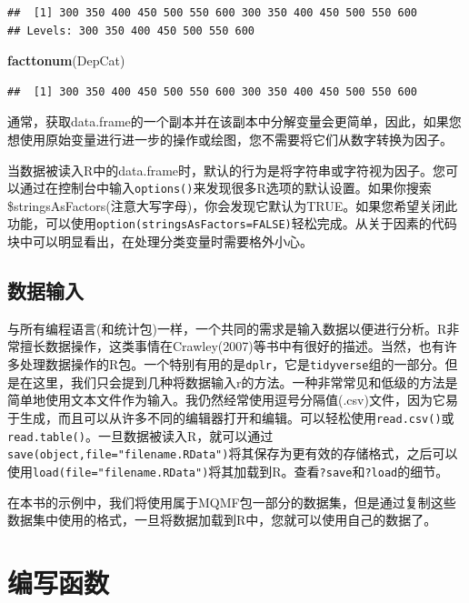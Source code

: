 \documentclass[
  lang=cn,
  11pt,
  scheme=chinese,
  chinesefont=nofont,
  citestyle=gb7714-2015,
  bibstyle=gb7714-2015]{elegantbook}
\newenvironment{Shaded}{\begin{snugshade}}{\end{snugshade}}
\newcommand{\FunctionTok}[1]{\textcolor[rgb]{0.13,0.29,0.53}{\textbf{#1}}}
\newcommand{\NormalTok}[1]{#1}
\begin{document}
\begin{verbatim}
##  [1] 300 350 400 450 500 550 600 300 350 400 450 500 550 600
## Levels: 300 350 400 450 500 550 600
\end{verbatim}

\begin{Shaded}
\begin{Highlighting}[]
\FunctionTok{facttonum}\NormalTok{(DepCat)  }
\end{Highlighting}
\end{Shaded}

\begin{verbatim}
##  [1] 300 350 400 450 500 550 600 300 350 400 450 500 550 600
\end{verbatim}

通常，获取data.frame的一个副本并在该副本中分解变量会更简单，因此，如果您想使用原始变量进行进一步的操作或绘图，您不需要将它们从数字转换为因子。

当数据被读入R中的data.frame时，默认的行为是将字符串或字符视为因子。您可以通过在控制台中输入\texttt{options()}来发现很多R选项的默认设置。如果你搜索\$stringsAsFactors(注意大写字母)，你会发现它默认为TRUE。如果您希望关闭此功能，可以使用\texttt{option(stringsAsFactors=FALSE)}轻松完成。从关于因素的代码块中可以明显看出，在处理分类变量时需要格外小心。

\subsection{数据输入}\label{ux6570ux636eux8f93ux5165}

与所有编程语言(和统计包)一样，一个共同的需求是输入数据以便进行分析。R非常擅长数据操作，这类事情在Crawley(2007)等书中有很好的描述。当然，也有许多处理数据操作的R包。一个特别有用的是\texttt{dplr}，它是\texttt{tidyverse}组的一部分。但是在这里，我们只会提到几种将数据输入r的方法。一种非常常见和低级的方法是简单地使用文本文件作为输入。我仍然经常使用逗号分隔值(.csv)文件，因为它易于生成，而且可以从许多不同的编辑器打开和编辑。可以轻松使用\texttt{read.csv()}或\texttt{read.table()}。一旦数据被读入R，就可以通过\texttt{save(object,file="filename.RData")}将其保存为更有效的存储格式，之后可以使用\texttt{load(file="filename.RData")}将其加载到R。查看\texttt{?save}和\texttt{?load}的细节。

在本书的示例中，我们将使用属于MQMF包一部分的数据集，但是通过复制这些数据集中使用的格式，一旦将数据加载到R中，您就可以使用自己的数据了。

\section{编写函数}\label{ux7f16ux5199ux51fdux6570}
\end{document}
